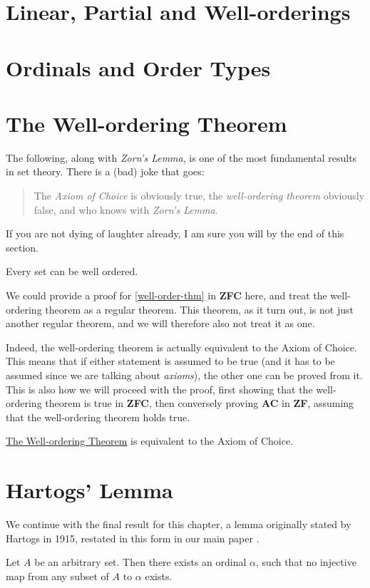 \documentclass[../../main.tex]{subfiles}
\begin{document}
\section{Linear, Partial and Well-orderings}

\section{Ordinals and Order Types}

\section{The Well-ordering Theorem}
The following, along with \textit{Zorn's Lemma}, is one of the most fundamental results in set theory.
There is a (bad) joke that goes:
\begin{quote} %
    The \textit{Axiom of Choice} is obviously true, the \textit{well-ordering theorem} obviously false, 
    and who knows with \textit{Zorn's Lemma}.
\end{quote}
If you are not dying of laughter already, I am sure you will by the end of this section.

\begin{definition}\cite{Jec78}\label{well-order-thm}
    Every set can be well ordered.
\end{definition}

We could provide a proof for \ref{well-order-thm} in \textbf{ZFC} here, 
and treat the well-ordering theorem as a regular theorem.
This theorem, as it turn out, is not just another regular theorem, and we will therefore also not treat it as one.

Indeed, the well-ordering theorem is actually equivalent to the Axiom of Choice.
This means that if either statement is assumed to be true (and it has to be assumed since we are talking about \textit{axioms}),
the other one can be proved from it.
This is also how we will proceed with the proof, first showing that the well-ordering theorem is true in \textbf{ZFC},
then conversely proving \textbf{AC} in \textbf{ZF}, assuming that the well-ordering theorem holds true.

\begin{theorem}
    \hyperref[well-order-thm]{The Well-ordering Theorem} is equivalent to the Axiom of Choice. %
\end{theorem}

\section{Hartogs' Lemma}
We continue with the final result for this chapter, 
a lemma originally stated by Hartogs in 1915, restated in this form in our main paper \cite{Haj72}.

\begin{lemma}\cite{Har15}
    Let $A$ be an arbitrary set.
    Then there exists an ordinal $\alpha$, 
    such that no injective map from any subset of $A$ to $\alpha$ exists. %
\end{lemma}
\end{document}
